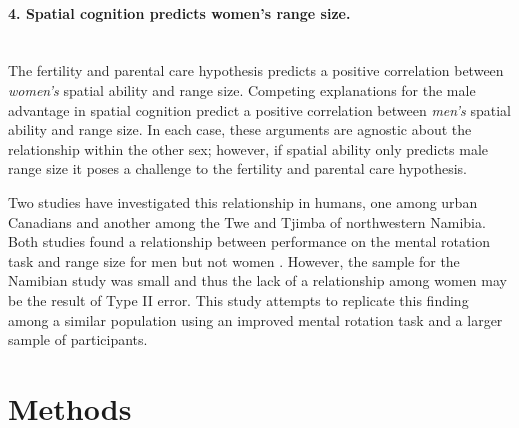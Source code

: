 \paragraph{4. Spatial cognition predicts women's range size.}\mbox{}\\

The fertility and parental care hypothesis predicts a positive correlation between \emph{women's} spatial ability and range size. Competing explanations for the male advantage in spatial cognition predict a positive correlation between \emph{men's} spatial ability and range size.  In each case, these arguments are agnostic about the relationship within the other sex; however, if spatial ability only predicts male range size it poses a challenge to the fertility and parental care hypothesis.  


Two studies have investigated this relationship in humans, one among urban Canadians and another among the Twe and Tjimba of northwestern Namibia.  Both studies found a relationship between performance on the mental rotation task and range size for men but not women \citep{ecuyer2004spatial, vashro2014spatial}.  However, the sample for the Namibian study was small and thus the lack of a relationship among women may be the result of Type II error.  This study attempts to replicate this finding among a similar population using an improved mental rotation task and a larger sample of participants. 

\section{Methods}
\label{sec:2}
